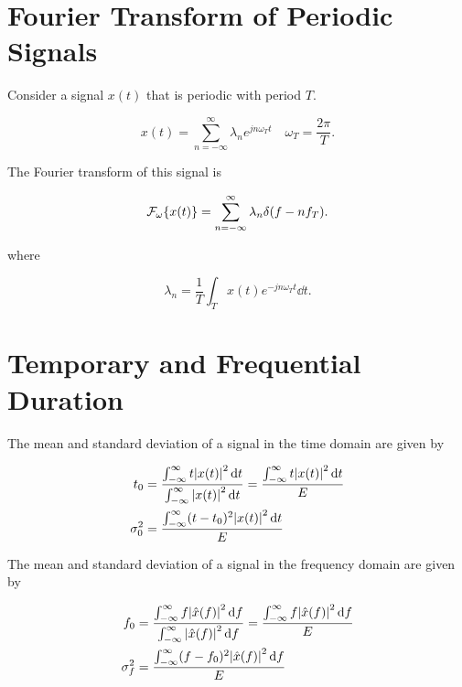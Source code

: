 \documentclass{report}
\newcommand{\Ft}[1]{\SF_\omega\!\lt\{ #1 \rt\}}
\begin{document}
\nt{
	\[
		\Ft{x(t)} = \frac{\Ft{x'(t)}}{j\omega} + a\delta(f)
		.\]

	where
	\[
		a = \lim_{T\to\infty} \frac{1}{T} \int_{-T/2}^{T/2} x(t) \dd{t}
		.\]
}

\section{Fourier Transform of Periodic Signals}

Consider a signal $x(t)$ that is periodic with period $T$.

\[
	x(t) = \sum_{n=-\infty}^{\infty} \lambda_n e^{jn\omega_Tt} \quad \omega_T = \frac{2\pi}{T}
	.\]

The Fourier transform of this signal is

\[
	\Ft{x(t)} = \sum_{n=-\infty}^{\infty} \lambda_n \delta(f-nf_T)
	.\]

where

\[
	\lambda_n = \frac{1}{T}\int_{T} x(t)e^{-jn\omega_Tt} \dd{t}
	.\]

\section{Temporary and Frequential Duration}

The mean and standard deviation of a signal in the time domain are given by

\begin{align*}
	t_0        & = \frac{\int_{-\infty}^\infty t \abs{x(t)}^2 \dd{t}}{\int_{-\infty}^\infty \abs{x(t)}^2 \dd{t}} = \frac{\int_{-\infty}^\infty t \abs{x(t)}^2 \dd{t}}{E} \\
	\sigma_0^2 & = \frac{\int_{-\infty}^\infty (t-t_0)^2 \abs{x(t)}^2 \dd{t}}{E}
\end{align*}

The mean and standard deviation of a signal in the frequency domain are given by

\begin{align*}
	f_0        & = \frac{\int_{-\infty}^\infty f \abs{\hat{x}(f)}^2 \dd{f}}{\int_{-\infty}^\infty \abs{\hat{x}(f)}^2 \dd{f}} = \frac{\int_{-\infty}^\infty f \abs{\hat{x}(f)}^2 \dd{f}}{E} \\
	\sigma_f^2 & = \frac{\int_{-\infty}^\infty (f-f_0)^2 \abs{\hat{x}(f)}^2 \dd{f}}{E}
\end{align*}

\end{document}
